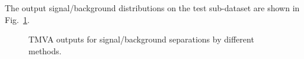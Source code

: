 The output signal/background distributions on the test sub-dataset are shown in Fig.~\ref{output_separation_allE}.
\begin{figure}[htbp]
	\centering
	\caption{TMVA outputs for signal/background separations by different methods.}
	\label{output_separation_allE}
\end{figure}


